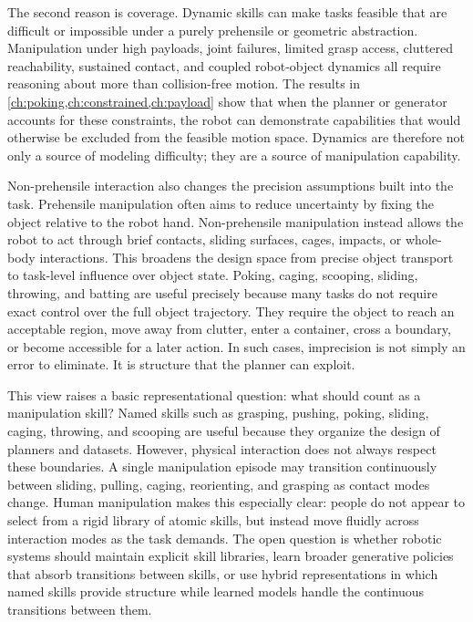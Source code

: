 The second reason is coverage.
Dynamic skills can make tasks feasible that are difficult or impossible under a purely prehensile or geometric abstraction.
Manipulation under high payloads, joint failures, limited grasp access, cluttered reachability, sustained contact, and coupled robot-object dynamics all require reasoning about more than collision-free motion.
The results in \cref{ch:poking,ch:constrained,ch:payload} show that when the planner or generator accounts for these constraints, the robot can demonstrate capabilities that would otherwise be excluded from the feasible motion space.
Dynamics are therefore not only a source of modeling difficulty; they are a source of manipulation capability.

Non-prehensile interaction also changes the precision assumptions built into the task.
Prehensile manipulation often aims to reduce uncertainty by fixing the object relative to the robot hand.
Non-prehensile manipulation instead allows the robot to act through brief contacts, sliding surfaces, cages, impacts, or whole-body interactions.
This broadens the design space from precise object transport to task-level influence over object state.
Poking, caging, scooping, sliding, throwing, and batting are useful precisely because many tasks do not require exact control over the full object trajectory.
They require the object to reach an acceptable region, move away from clutter, enter a container, cross a boundary, or become accessible for a later action.
In such cases, imprecision is not simply an error to eliminate.
It is structure that the planner can exploit.

This view raises a basic representational question: what should count as a manipulation skill?
Named skills such as grasping, pushing, poking, sliding, caging, throwing, and scooping are useful because they organize the design of planners and datasets.
However, physical interaction does not always respect these boundaries.
A single manipulation episode may transition continuously between sliding, pulling, caging, reorienting, and grasping as contact modes change.
Human manipulation makes this especially clear: people do not appear to select from a rigid library of atomic skills, but instead move fluidly across interaction modes as the task demands.
The open question is whether robotic systems should maintain explicit skill libraries, learn broader generative policies that absorb transitions between skills, or use hybrid representations in which named skills provide structure while learned models handle the continuous transitions between them.

